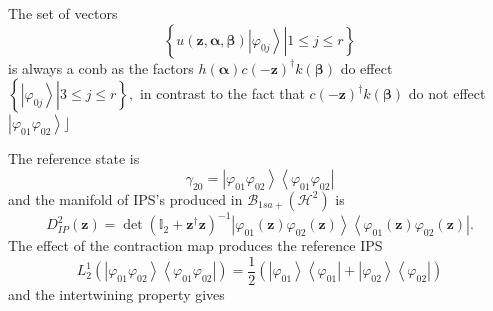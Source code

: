 \documentclass[aps,preprint]{revtex4}%
\begin{document}
The set of vectors
\begin{equation}
\left\{  \left.  u\left(  \mathbf{z,\alpha,\beta}\right)  \left\vert
\varphi_{0j}\right\rangle \right\vert 1\leq j\leq r\right\}
\end{equation}
is always a conb as the factors $h\left(  \mathbf{\alpha}\right)  c\left(
-\mathbf{z}\right)  ^{\dagger}k\left(  \mathbf{\beta}\right)  $ do effect
$\left\{  \left.  \left\vert \varphi_{0j}\right\rangle \right\vert 3\leq j\leq
r\right\}  ,$ in contrast to the fact that $c\left(  -\mathbf{z}\right)
^{\dagger}k\left(  \mathbf{\beta}\right)  $ do not effect $\left\vert
\varphi_{01}\varphi_{02}\right\rangle \rfloor$

The reference state is
\begin{equation}
\gamma_{20}=\left\vert \varphi_{01}\varphi_{02}\right\rangle \left\langle
\varphi_{01}\varphi_{02}\right\vert
\end{equation}
and the manifold of IPS's produced in $\mathcal{B}_{1sa+}\left(
\mathcal{H}^{2}\right)  $ is
\begin{equation}
D_{IP}^{2}\left(  \mathbf{z}\right)  =\det\left(  \mathbb{I}_{2}%
+\mathbf{z}^{\dagger}\mathbf{z}\right)  ^{-1}\left\vert \varphi_{01}\left(
\mathbf{z}\right)  \varphi_{02}\left(  \mathbf{z}\right)  \right\rangle
\left\langle \varphi_{01}\left(  \mathbf{z}\right)  \varphi_{02}\left(
\mathbf{z}\right)  \right\vert .
\end{equation}
The effect of the contraction map produces the reference IPS\
\begin{equation}
L_{2}^{1}\left(  \left\vert \varphi_{01}\varphi_{02}\right\rangle \left\langle
\varphi_{01}\varphi_{02}\right\vert \right)  =\frac{1}{2}\left(  \left\vert
\varphi_{01}\right\rangle \left\langle \varphi_{01}\right\vert +\left\vert
\varphi_{02}\right\rangle \left\langle \varphi_{02}\right\vert \right)
\end{equation}
and the intertwining property gives
\end{document}
